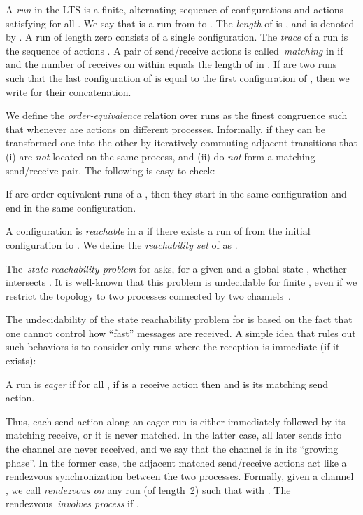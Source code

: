 \documentclass{LMCS}
\newenvironment{definition}{\begin{defi}}{\end{defi}}
\begin{document}
\medskip

A \emph{run} in the LTS  is a
finite, alternating sequence  of
configurations  and actions  satisfying
 for all . We say
that  is a run from  to . The
\emph{length} of  is , and is denoted by .
A run of length zero consists of a single configuration.
The \emph{trace} of a run
     is the sequence of actions
    .
A pair of send/receive
actions  is called~\emph{matching} in
 if  and the number of receives on  within
 equals the length of  in .
If  are two runs such that the last configuration of 
is equal to the first configuration of , then we write
 for their concatenation.

We
define the \emph{order-equivalence} relation  over runs as the
finest congruence such that  whenever   are actions on different processes.
Informally,  if they can be
transformed one into the other by iteratively commuting adjacent
transitions that (i) are \emph{not} located on the same
process, and (ii) do \emph{not} form a matching send/receive pair.
The following is easy to check:

\begin{fact}
  If  are order-equivalent runs of a \qcp, then
  they start in the same configuration and end in the same configuration.
\end{fact}

\medskip

A configuration  is \emph{reachable} in a \qcp  if there
exists a run of  from the initial configuration  to
.  We define the \emph{reachability set} of  as
.

\smallskip

The~\emph{state reachability problem} for \qcp asks, for a given \qcp
 and a global state , whether 
 intersects
.  It is well-known that this problem is
undecidable for finite \qcp, even if we restrict the
topology to two
processes connected by two channels~\cite{brand-d-1983-323-a}.













The undecidability of the state reachability problem for \qcp is based on
the fact that one cannot control how ``fast'' messages are received.
A simple idea that rules out such behaviors is to consider only runs
where the reception is immediate (if it exists):

\begin{definition}
  A run  is \emph{eager} if for all
  , if  is a receive action then  and
   is its matching send action. \label{def:bounded_run}
\end{definition}
Thus, each send action along an eager run is either immediately
followed by its matching receive, or it is never matched.  In
the latter case, all later sends into the channel are never received,
and we say that the channel is in its ``growing phase''.  In the
former case, the adjacent matched send/receive actions act like a
rendezvous synchronization between the two processes.  Formally, given
a channel , we call \emph{rendezvous on } any run (of
length~2)  such that  with . The rendezvous~\emph{involves
  process } if .
\end{document}
